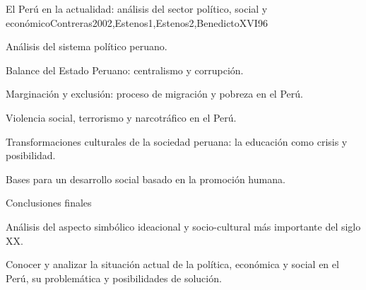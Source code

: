 \begin{syllabus}
\begin{unit}{El Perú en la actualidad: análisis del sector político, social y económico}{Contreras2002,Estenos1,Estenos2,BenedictoXVI}{9}{6}
\begin{topics}
	\item Análisis del sistema político peruano.
	\item Balance del Estado Peruano: centralismo y corrupción.
	\item Marginación y exclusión: proceso de migración y pobreza en el Perú.
	\item Violencia social, terrorismo y narcotráfico en el Perú.
	\item Transformaciones culturales de la sociedad peruana: la educación como crisis y posibilidad.
	\item Bases para un desarrollo social basado en la promoción  humana.
	\item Conclusiones finales

	\item Análisis del aspecto simbólico ideacional y socio-cultural más importante del siglo XX. 

\end{topics}
\begin{unitgoals}
	\item Conocer y analizar la situación actual de la política, económica y social en el Perú, su problemática y posibilidades de solución.
\end{unitgoals}
\end{unit}



\begin{coursebibliography}
\end{coursebibliography}
\end{syllabus}

